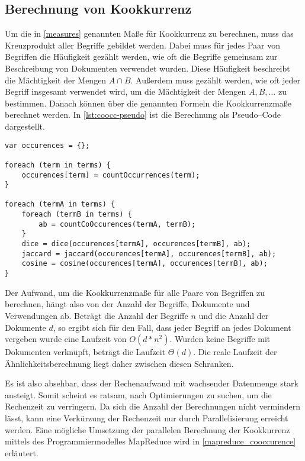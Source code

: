 \subsection{Berechnung von Kookkurrenz}

Um die in \cref{measures} genannten Maße für Kookkurrenz zu berechnen, muss das Kreuzprodukt aller Begriffe gebildet werden. Dabei muss für jedes Paar von Begriffen die Häufigkeit gezählt werden, wie oft die Begriffe gemeinsam zur Beschreibung von Dokumenten verwendet wurden. Diese Häufigkeit beschreibt die Mächtigkeit der Mengen \(A \cap B\). Außerdem muss gezählt werden, wie oft jeder Begriff insgesamt verwendet wird, um die Mächtigkeit der Mengen \(A, B, \dots\) zu bestimmen. Danach können über die genannten Formeln die Kookkurrenzmaße berechnet werden. In \cref{lst:coocc-pseudo} ist die Berechnung als Pseudo--Code dargestellt.

\begin{lstlisting}[language=pseudo, label={lst:coocc-pseudo}, caption={Kookkurrenzberechnung}]
var occurences = {};

foreach (term in terms) {
    occurences[term] = countOccurrences(term);
}

foreach (termA in terms) {
    foreach (termB in terms) {
        ab = countCoOccurences(termA, termB);
    }
    dice = dice(occurences[termA], occurences[termB], ab);
    jaccard = jaccard(occurences[termA], occurences[termB], ab);
    cosine = cosine(occurences[termA], occurences[termB], ab);
}
\end{lstlisting}

Der Aufwand, um die Kookkurrenzmaße für alle Paare von Begriffen zu berechnen, hängt also von der Anzahl der Begriffe, Dokumente und Verwendungen ab. Beträgt die Anzahl der Begriffe \(n\) und die Anzahl der Dokumente \(d\), so ergibt sich für den Fall, dass jeder Begriff an jedes Dokument vergeben wurde eine Laufzeit von \(O(d*n^2)\). Wurden keine Begriffe mit Dokumenten verknüpft, beträgt die Laufzeit \(\Theta(d)\). Die reale Laufzeit der Ähnlichkeitsberechnung liegt daher zwischen diesen Schranken.

Es ist also absehbar, dass der Rechenaufwand mit wachsender Datenmenge stark ansteigt. Somit scheint es ratsam, nach Optimierungen zu suchen, um die Rechenzeit zu verringern. Da sich die Anzahl der Berechnungen nicht vermindern lässt, kann eine Verkürzung der Rechenzeit nur durch Parallelisierung erreicht werden. Eine mögliche Umsetzung der parallelen Berechnung der Kookkurrenz mittels des Programmiermodelles  MapReduce wird in \cref{mapreduce_cooccurence} erläutert.

